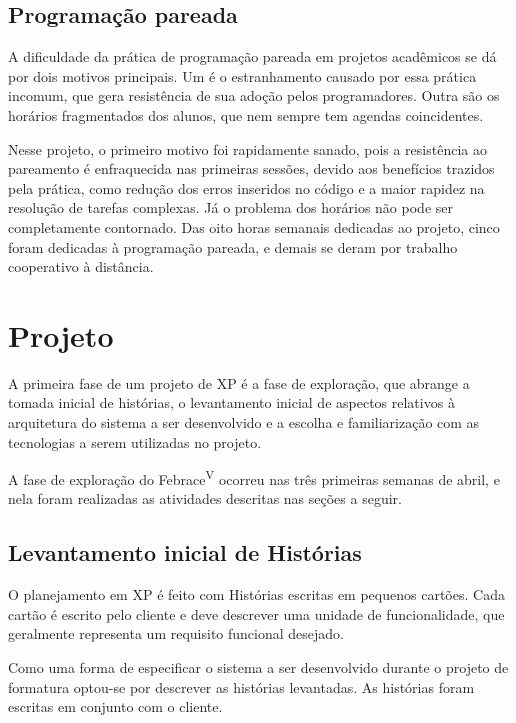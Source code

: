   \subsection{Programação pareada}
    A dificuldade da prática de programação pareada em projetos acadêmicos se dá por dois motivos principais. Um é o estranhamento causado por essa prática incomum, que gera resistência de sua adoção pelos programadores. Outra são os horários fragmentados dos alunos, que nem sempre tem agendas coincidentes.

    Nesse projeto, o primeiro motivo foi rapidamente sanado, pois a resistência ao pareamento é enfraquecida nas primeiras sessões, devido aos benefícios trazidos pela prática, como redução dos erros inseridos no código e a maior rapidez na resolução de tarefas complexas. Já o problema dos horários não pode ser completamente contornado. Das oito horas semanais dedicadas ao projeto, cinco foram dedicadas à programação pareada, e demais se deram por trabalho cooperativo à distância.

\section{Projeto}

  A primeira fase de um projeto de XP é a fase de exploração\cite{beck04}, que abrange a tomada inicial de histórias, o levantamento inicial de aspectos relativos à arquitetura do sistema a ser desenvolvido e a escolha e familiarização com as tecnologias a serem utilizadas no projeto.

  A fase de exploração do Febrace\textsuperscript{V} ocorreu nas três primeiras semanas de abril, e nela foram realizadas as atividades descritas nas seções a seguir.

  \subsection{Levantamento inicial de Histórias}

    O planejamento em XP é feito com Histórias escritas em pequenos cartões. Cada cartão é escrito pelo cliente e deve descrever uma unidade de funcionalidade, que geralmente representa um requisito funcional desejado\cite{sato07}.

    Como uma forma de especificar o sistema a ser desenvolvido durante o projeto de formatura optou-se por descrever as histórias levantadas. As histórias foram escritas em conjunto com o cliente.

